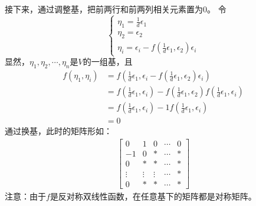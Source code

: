 \documentclass{article}
\begin{document}
接下来，通过调整基，把前两行和前两列相关元素置为0。
令
\begin{equation*}
  \begin{cases*}
    \eta_1 = \frac{1}{d} \epsilon_1 \\
    \eta_2 = \epsilon_2             \\
    \eta_i = \epsilon_i - f(\frac{1}{d} \epsilon_1, \epsilon_2) \epsilon_i
  \end{cases*}
\end{equation*}
显然，$\eta_1, \eta_2, \cdots, \eta_n$是$V$的一组基，且
\begin{align*}
  f(\eta_1, \eta_i)
   & = f(\frac{1}{d} \epsilon_1, \epsilon_i - f(\frac{1}{d} \epsilon_1, \epsilon_2) \epsilon_i)                            \\
   & = f(\frac{1}{d} \epsilon_1, \epsilon_i) - f(\frac{1}{d} \epsilon_1, \epsilon_2) f(\frac{1}{d} \epsilon_1, \epsilon_i) \\
   & = f(\frac{1}{d} \epsilon_1, \epsilon_i) - 1 f(\frac{1}{d} \epsilon_1, \epsilon_i)                                     \\
   & = 0
\end{align*}
通过换基，此时的矩阵形如：
\begin{align*}
  \begin{bmatrix}
    0      & 1      & 0      & \cdots & 0 \\
    - 1    & 0      & *      & \cdots & * \\
    0      & *      & *      & \cdots & * \\
    \vdots & \vdots & \vdots & \cdots & * \\
    0      & *      & *      & \cdots & *
  \end{bmatrix}
\end{align*}
注意：由于$f$是反对称双线性函数，在任意基下的矩阵都是对称矩阵。
\end{document}
